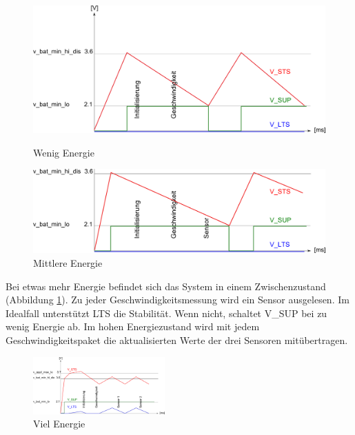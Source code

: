 \begin{figure}[ht]
    \begin{minipage}[t]{0.5\textwidth}
      \includegraphics[width=1.0\textwidth]{3Vorgehen/imag/LOW_ENERGY.png}
      \caption{Wenig Energie}
      \label{LOW_ENER}
    \end{minipage}
    \begin{minipage}[t]{0.5\textwidth}
      \includegraphics[width=1.0\textwidth]{3Vorgehen/imag/MIDDLE_ENERGY.png}
      \caption{Mittlere Energie}
      \label{MID_ENER}
    \end{minipage}
\end{figure}

Bei etwas mehr Energie befindet sich das System in einem Zwischenzustand (Abbildung \ref{MID_ENER}). Zu jeder Geschwindigkeitsmessung wird ein Sensor ausgelesen. Im Idealfall unterstützt LTS die Stabilität. Wenn nicht, schaltet V\_SUP bei zu wenig Energie ab. Im hohen Energiezustand wird mit jedem Geschwindigkeitspaket die aktualisierten Werte der drei Sensoren mitübertragen. 

\begin{figure}[ht]
  \includegraphics[width=0.45\textwidth]{3Vorgehen/imag/HIGH_ENERGY.png}
  \caption{Viel Energie}
  \label{HIGH_ENER}
\end{figure}

